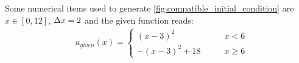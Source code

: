 Some numerical items used to generate \autoref{fig:compatible_initial_condition} are $x \in [0, 12]$, $\Delta x=2$ and the given function reads:
\begin{align}
    &u_{given}(x) =
    \begin{cases}
        (x-3)^2 & \qquad x < 6
        \\ 
        -(x-3)^2 + 18 & \qquad x \geq 6
    \end{cases}
\end{align}